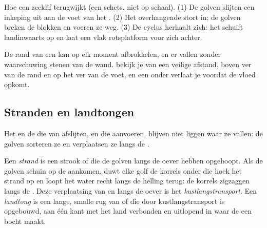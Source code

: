 \begin{omfigure}
{\small Hoe een zeeklif terugwijkt (een schets, niet op schaal). (1) De
golven slijten een inkeping uit aan de voet van het . (2) Het
overhangende  stort in; de golven breken de blokken en voeren ze
weg. (3) De cyclus herhaalt zich: het  schuift landinwaarts op en laat
een vlak rotsplatform voor zich achter.}
\label{fig:g9:landforms:cliff-retreat}
\end{omfigure}

\begin{safety}
De rand van een  kan op elk moment afbrokkelen, en er vallen zonder
waarschuwing stenen van de wand.  bekijk je van een veilige afstand,
boven ver van de rand en op het  ver van de voet, en een  onder
 verlaat je voordat de vloed opkomt.
\end{safety}

\subsection{Stranden en landtongen}

Het  en de  die van  afslijten, en die  aanvoeren,
blijven niet liggen waar ze vallen: de golven sorteren ze en verplaatsen ze
langs de .

\begin{definition}\label{def:g9:landforms:beach}
Een \emph{strand} is een strook  of  die de golven
langs de oever hebben opgehoopt. Als de golven schuin op de  aankomen,
duwt elke golf de korrels onder die hoek het strand op en loopt het water
recht langs de helling terug: de korrels zigzaggen langs de . Deze
verplaatsing van  en  langs de oever is het
\emph{kustlangstransport}. Een
\emph{landtong} is een lange, smalle rug van  of 
die door kustlangstransport is opgebouwd, aan één kant met het land
verbonden en uitlopend in  waar de  een bocht maakt.
\end{definition}


